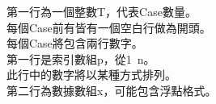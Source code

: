 第一行為一個整數T，代表Case數量。\\
每個Case前有皆有一個空白行做為開頭。\\
每個Case將包含兩行數字。\\
第一行是索引數組p，從1~n。\\
此行中的數字將以某種方式排列。\\
第二行為數據數組x，可能包含浮點格式。\\

